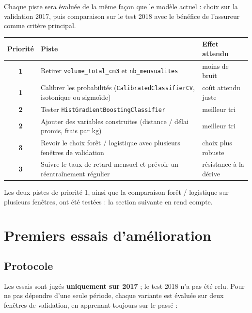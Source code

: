 \documentclass[11pt,a4paper]{article}
\newcommand{\var}[1]{\texttt{#1}}
\begin{document}
Chaque piste sera évaluée de la même façon que le modèle actuel : choix sur la validation 2017,
puis comparaison sur le test 2018 avec le bénéfice de l'assureur comme critère principal.

\begin{center}
\begin{tabularx}{\linewidth}{@{}c X l@{}}
\toprule
Priorité & Piste & Effet attendu \\
\midrule
\textcolor{sinistre}{\textbf{1}} & Retirer \var{volume\_total\_cm3} et \var{nb\_mensualites} & moins de bruit \\
\textcolor{sinistre}{\textbf{1}} & Calibrer les probabilités (\var{CalibratedClassifierCV}, isotonique ou sigmoïde) & coût attendu juste \\
\textcolor{prudence}{\textbf{2}} & Tester \var{HistGradientBoostingClassifier} & meilleur tri \\
\textcolor{prudence}{\textbf{2}} & Ajouter des variables construites (distance / délai promis, frais par kg) & meilleur tri \\
\textcolor{correct}{\textbf{3}} & Revoir le choix forêt / logistique avec plusieurs fenêtres de validation & choix plus robuste \\
\textcolor{correct}{\textbf{3}} & Suivre le taux de retard mensuel et prévoir un réentraînement régulier & résistance à la dérive \\
\bottomrule
\end{tabularx}
\end{center}

Les deux pistes de priorité 1, ainsi que la comparaison forêt / logistique sur plusieurs
fenêtres, ont été testées : la section suivante en rend compte.

\section{Premiers essais d'amélioration}

\subsection{Protocole}

Les essais sont jugés \textbf{uniquement sur 2017} ; le test 2018 n'a pas été relu. Pour ne
pas dépendre d'une seule période, chaque variante est évaluée sur deux fenêtres de
validation, en apprenant toujours sur le passé :
\end{document}
